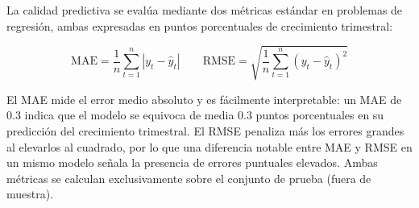 La calidad predictiva se evalúa mediante dos métricas estándar en problemas de regresión, ambas expresadas en puntos porcentuales de crecimiento trimestral:

\[
\text{MAE} = \frac{1}{n}\sum_{t=1}^{n}|y_t - \hat{y}_t|
\qquad
\text{RMSE} = \sqrt{\frac{1}{n}\sum_{t=1}^{n}(y_t - \hat{y}_t)^2}
\]

El MAE mide el error medio absoluto y es fácilmente interpretable: un MAE de 0.3 indica que el modelo se equivoca de media 0.3 puntos porcentuales en su predicción del crecimiento trimestral. El RMSE penaliza más los errores grandes al elevarlos al cuadrado, por lo que una diferencia notable entre MAE y RMSE en un mismo modelo señala la presencia de errores puntuales elevados. Ambas métricas se calculan exclusivamente sobre el conjunto de prueba (fuera de muestra).